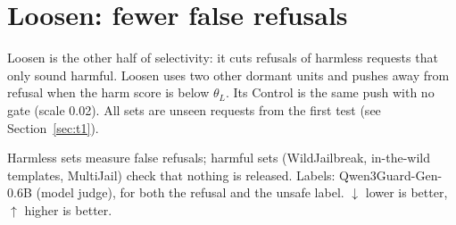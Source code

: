 \documentclass[10pt,a4paper]{article}
\begin{document}
\section{Loosen: fewer false refusals}\label{sec:loosen}
Loosen is the other half of selectivity: it cuts refusals of harmless requests that only sound harmful. Loosen uses two other dormant units and pushes away from refusal when the harm score is below $\theta_L$. Its Control is the same push with no gate (scale 0.02). All sets are unseen requests from the first test (see Section~\ref{sec:t1}).

\vspace{-3pt}\noindent Harmless sets measure false refusals; harmful sets (WildJailbreak, in-the-wild templates, MultiJail) check that nothing is released. Labels: Qwen3Guard-Gen-0.6B (model judge), for both the refusal and the unsafe label. $\downarrow$ lower is better, $\uparrow$ higher is better.
\end{document}
